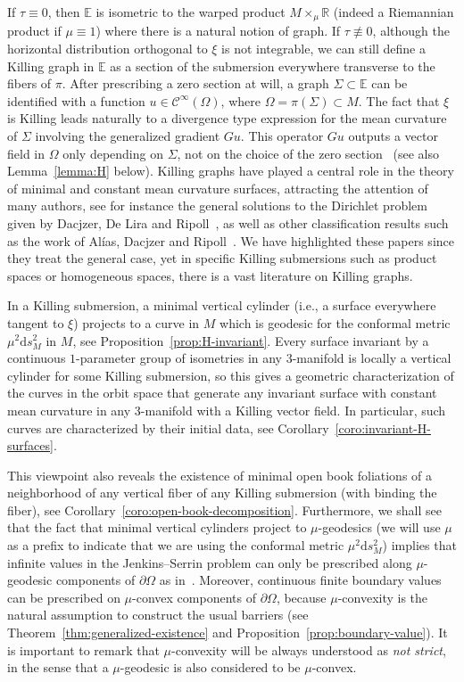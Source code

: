 \documentclass[a4paper,10pt,reqno]{amsart}
\newcommand{\R}{\mathbb{R}}
\newcommand{\df}{\mathrm{d}}
\newcommand{\E}{\mathbb{E}}
\theoremstyle{definition}
\theoremstyle{remark}
\numberwithin{equation}{section}
\begin{document}
If $\tau\equiv 0$, then $\E$ is isometric to the warped product $M\times_\mu\R$ (indeed a Riemannian product if $\mu\equiv 1$) where there is a natural notion of graph. If $\tau\not\equiv 0$, although the horizontal distribution orthogonal to $\xi$ is not integrable, we can still define a Killing graph in $\E$ as a section of the submersion everywhere transverse to the fibers of $\pi$. After prescribing a zero section at will, a graph $\Sigma\subset\E$ can be identified with a function $u\in\mathcal C^\infty(\Omega)$, where $\Omega=\pi(\Sigma)\subset M$. The fact that $\xi$ is Killing leads naturally to a divergence type expression for the mean curvature of $\Sigma$ involving the generalized gradient $Gu$. This operator $Gu$ outputs a vector field in $\Omega$ only depending on $\Sigma$, not on the choice of the zero section~\cite[Lemma~3.1]{LerMan} (see also Lemma~\ref{lemma:H} below). Killing graphs have played a central role in the theory of minimal and constant mean curvature surfaces, attracting the attention of many authors, see for instance the general solutions to the Dirichlet problem given by Dacjzer, De Lira and Ripoll~\cite{DD,DDR}, as well as other classification results such as the work of Alías, Dacjzer and Ripoll~\cite{ADR}. We have highlighted these papers since they treat the general case, yet in specific Killing submersions such as product spaces or homogeneous spaces, there is a vast literature on Killing graphs.

In a Killing submersion, a minimal vertical cylinder (i.e., a surface everywhere tangent to $\xi$) projects to a curve in $M$ which is geodesic for the conformal metric $\mu^2\df s_M^2$ in $M$, see Proposition~\ref{prop:H-invariant}. Every surface invariant by a continuous $1$-parameter group of isometries in any $3$-manifold is locally a vertical cylinder for some Killing submersion, so this gives a geometric characterization of the curves in the orbit space that generate any invariant surface with constant mean curvature in any $3$-manifold with a Killing vector field. In particular, such curves are characterized by their initial data, see Corollary~\ref{coro:invariant-H-surfaces}. 

This viewpoint also reveals the existence of minimal open book foliations of a neighborhood of any vertical fiber of any Killing submersion (with binding the fiber), see Corollary~\ref{coro:open-book-decomposition}. Furthermore, we shall see that the fact that minimal vertical cylinders project to $\mu$-geodesics (we will use $\mu$ as a prefix to indicate that we are using the conformal metric $\mu^2\df s_M^2$) implies that infinite values in the Jenkins--Serrin problem can only be prescribed along $\mu$-geodesic components of $\partial\Omega$ as in~\cite[Thm.~3.3]{RST}. Moreover, continuous finite boundary values can be prescribed on $\mu$-convex components of $\partial\Omega$, because $\mu$-convexity is the natural assumption to construct the usual barriers (see Theorem~\ref{thm:generalized-existence} and Proposition~\ref{prop:boundary-value}). It is important to remark that $\mu$-convexity will be always understood as \emph{not strict}, in the sense that a $\mu$-geodesic is also considered to be $\mu$-convex.
\end{document}
